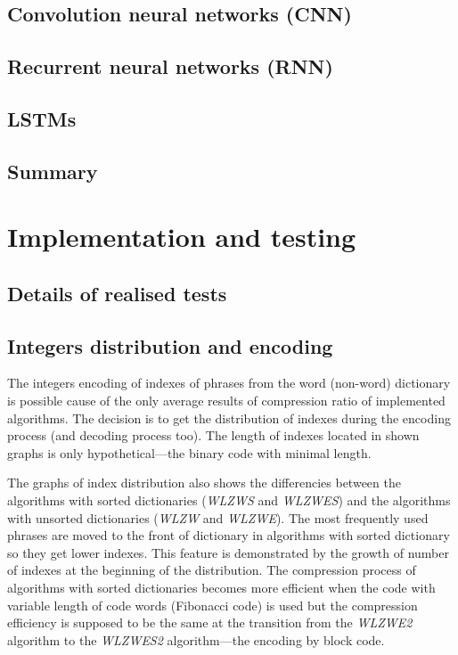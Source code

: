 \documentclass[thesis=M,english]{FITthesis}[2012/10/20]
\begin{document}
\section{Convolution neural networks (CNN)}
\section{Recurrent neural networks (RNN)}
\section{LSTMs}
\section{Summary}




\chapter{Implementation and testing}\label{impltest}

\section{Details of realised tests}


\section{Integers distribution and encoding}\label{sec:distr}

The integers encoding of indexes of phrases from the word (non-word) dictionary is possible cause of the only average results of compression ratio of implemented algorithms. The decision is to get the distribution of indexes during the encoding process (and decoding process too). The length of indexes located in shown graphs is only hypothetical---the binary code with minimal length.

The graphs of index distribution also shows the differencies between the algorithms with sorted dictionaries (\textit{WLZWS} and \textit{WLZWES}) and the algorithms with unsorted dictionaries (\textit{WLZW} and \textit{WLZWE}). The most frequently used phrases are moved to the front of dictionary in algorithms with sorted dictionary so they get lower indexes. This feature is demonstrated by the growth of number of indexes at the beginning of the distribution. The compression process of algorithms with sorted dictionaries becomes more efficient when the code with variable length of code words (Fibonacci code) is used but the compression efficiency is supposed to be the same at the transition from the \textit{WLZWE2} algorithm to the \textit{WLZWES2} algorithm---the encoding by block code. 
\end{document}
